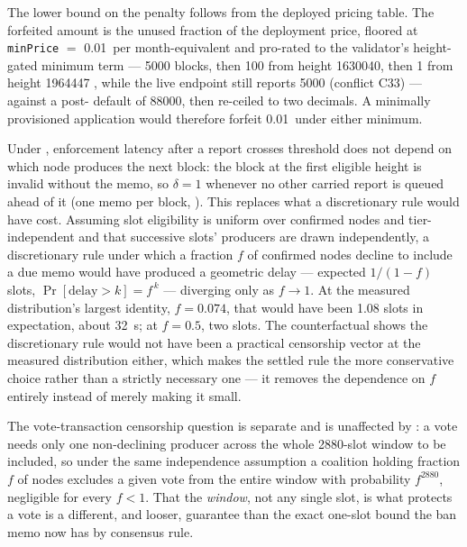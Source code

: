 The lower bound on the penalty follows from the deployed pricing table. The forfeited amount is the
unused fraction of the deployment price, floored at \texttt{minPrice} $=$ \num{0.01}\flux\ per
month-equivalent and pro-rated to the validator's height-gated minimum term --- \num{5000} blocks,
then \num{100} from height \num{1630040}, then \num{1} from height \num{1964447}
,
while the live endpoint still reports \num{5000}
 (conflict C33) --- against a
post-\PoN{} default of \num{88000}, then re-ceiled to two decimals. A minimally provisioned
application would therefore forfeit \num{0.01}\flux\ under either minimum.

\begin{property}
\label{prop:23:inclusion}
Under , enforcement latency after a report crosses threshold does
not depend on which node produces the next block: the block at the first eligible height is invalid
without the memo, so $\delta = 1$ whenever no other carried report is queued ahead of it (one memo
per block, ). This replaces what a discretionary rule would have
cost. Assuming \PoN{} slot eligibility is uniform over confirmed nodes and tier-independent
 and that successive slots' producers are drawn
independently, a discretionary rule under which a fraction $f$ of confirmed nodes decline to include
a due memo would have produced a geometric delay --- expected $1/(1-f)$ slots,
$\Pr[\text{delay} > k] = f^{\,k}$ --- diverging only as $f \to 1$. At the measured distribution's
largest identity, $f = 0.074$, that would have been \num{1.08} slots in expectation, about
\SI{32}{\second}; at $f = 0.5$, two slots. The counterfactual shows the discretionary rule would not
have been a practical censorship vector at the measured distribution either, which makes the settled
rule the more conservative choice rather than a strictly necessary one --- it removes the dependence
on $f$ entirely instead of merely making it small.
\end{property}

The vote-transaction censorship question is separate and is unaffected by
: a vote needs only one non-declining producer across the whole
\num{2880}-slot window to be included, so under the same independence assumption a coalition holding
fraction $f$ of nodes excludes a given vote from the entire window with probability
$f^{\num{2880}}$, negligible for every $f < 1$. That the \emph{window}, not any single slot, is what
protects a vote is a different, and looser, guarantee than the exact one-slot bound the ban memo now
has by consensus rule.

